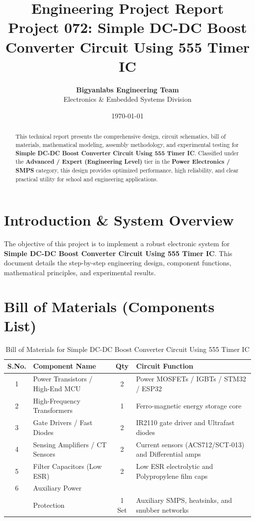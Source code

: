 \documentclass[11pt,a4paper]{article}
\title{\textbf{\Huge Engineering Project Report}\\[0.5em] \Large Project 072: Simple DC-DC Boost Converter Circuit Using 555 Timer IC}
\author{\textbf{Bigyanlabs Engineering Team}\\ Electronics \& Embedded Systems Division}
\date{\today}
\begin{document}
\maketitle
\thispagestyle{empty}

\begin{abstract}
This technical report presents the comprehensive design, circuit schematics, bill of materials, mathematical modeling, assembly methodology, and experimental testing for \textbf{Simple DC-DC Boost Converter Circuit Using 555 Timer IC}. Classified under the \textbf{Advanced / Expert (Engineering Level)} tier in the \textbf{Power Electronics / SMPS} category, this design provides optimized performance, high reliability, and clear practical utility for school and engineering applications.
\end{abstract}

\newpage
\tableofcontents
\newpage

\section{Introduction \& System Overview}
The objective of this project is to implement a robust electronic system for \textbf{Simple DC-DC Boost Converter Circuit Using 555 Timer IC}. This document details the step-by-step engineering design, component functions, mathematical principles, and experimental results.

\section{Bill of Materials (Components List)}
\begin{table}[h!]
\centering
\caption{Bill of Materials for Simple DC-DC Boost Converter Circuit Using 555 Timer IC}
\vspace{0.5em}
\begin{tabular}{clcp{7cm}}
\toprule
\textbf{S.No.} & \textbf{Component Name} & \textbf{Qty} & \textbf{Circuit Function} \\
\midrule
1 & Power Transistors / High-End MCU & 2 & Power MOSFETs / IGBTs / STM32 / ESP32 \\
2 & High-Frequency Transformers & 1 & Ferro-magnetic energy storage core \\
3 & Gate Drivers / Fast Diodes & 2 & IR2110 gate driver and Ultrafast diodes \\
4 & Sensing Amplifiers / CT Sensors & 2 & Current sensors (ACS712/SCT-013) and Differential amps \\
5 & Filter Capacitors (Low ESR) & 2 & Low ESR electrolytic and Polypropylene film caps \\
6 & Auxiliary Power \\& Protection & 1 Set & Auxiliary SMPS, heatsinks, and snubber networks \\
\bottomrule
\end{tabular}
\end{table}
\end{document}
